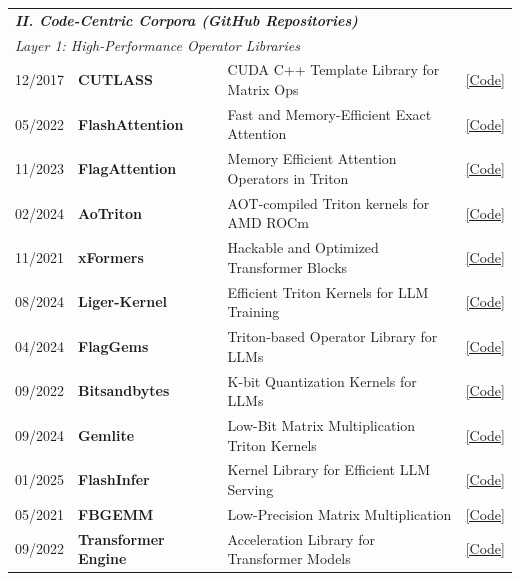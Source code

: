 \begin{table}[h!]
\begin{tabular}{l l p{6.8cm} l}
\midrule
\multicolumn{4}{l}{\textit{\textbf{II. Code-Centric Corpora (GitHub Repositories)}}} \\
\multicolumn{4}{l}{\cellcolor{gray!10}\textit{Layer 1: High-Performance Operator Libraries }} \\ 
12/2017 & \textbf{CUTLASS} & CUDA C++ Template Library for Matrix Ops & \href{https://github.com/NVIDIA/cutlass}{[Code]} \\
05/2022 & \textbf{FlashAttention}~\cite{dao2022flashattention} & Fast and Memory-Efficient Exact Attention & \href{https://github.com/Dao-AILab/flash-attention}{[Code]} \\
11/2023 & \textbf{FlagAttention}~\cite{flagattention2023} & Memory Efficient Attention Operators in Triton & \href{https://github.com/flagos-ai/FlagAttention}{[Code]} \\
02/2024 & \textbf{AoTriton}~\cite{amd2024aotriton} & AOT-compiled Triton kernels for AMD ROCm & \href{https://github.com/ROCm/aotriton}{[Code]} \\
11/2021 & \textbf{xFormers}~\cite{xFormers2022} & Hackable and Optimized Transformer Blocks & \href{https://github.com/facebookresearch/xformers}{[Code]} \\
08/2024 & \textbf{Liger-Kernel}~\cite{linkedin2024liger} & Efficient Triton Kernels for LLM Training & \href{https://github.com/linkedin/Liger-Kernel}{[Code]} \\
04/2024 & \textbf{FlagGems}~\cite{flaggems2024} & Triton-based Operator Library for LLMs & \href{https://github.com/FlagOpen/FlagGems}{[Code]} \\
09/2022 & \textbf{Bitsandbytes}~\cite{dettmers2022llmint8} & K-bit Quantization Kernels for LLMs & \href{https://github.com/bitsandbytes-foundation/bitsandbytes}{[Code]} \\
09/2024 & \textbf{Gemlite}~\cite{dropbox_gemlite_2024} & Low-Bit Matrix Multiplication Triton Kernels & \href{https://github.com/dropbox/gemlite}{[Code]} \\
01/2025 & \textbf{FlashInfer}~\cite{ye2025flashinfer} & Kernel Library for Efficient LLM Serving & \href{https://github.com/flashinfer-ai/flashinfer}{[Code]} \\
05/2021 & \textbf{FBGEMM}~\cite{khudia2021fbgemm} & Low-Precision Matrix Multiplication & \href{https://github.com/pytorch/FBGEMM}{[Code]} \\
09/2022 & \textbf{Transformer Engine}~\cite{transformerengine2024} & Acceleration Library for Transformer Models & \href{https://github.com/NVIDIA/TransformerEngine}{[Code]} \\


\end{tabular}
\end{table}
